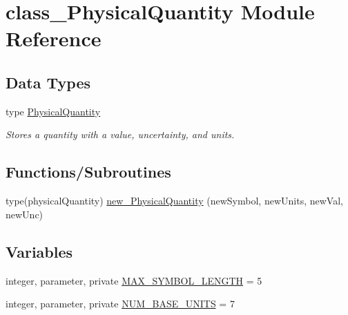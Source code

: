 \hypertarget{namespaceclass__PhysicalQuantity}{
\section{class\_\-PhysicalQuantity Module Reference}
\label{namespaceclass__PhysicalQuantity}
}
\subsection*{Data Types}
\begin{DoxyCompactItemize}
\item 
type \hyperlink{typeclass__PhysicalQuantity_1_1PhysicalQuantity}{PhysicalQuantity}
\begin{DoxyCompactList}\small\item\em Stores a quantity with a value, uncertainty, and units. \item\end{DoxyCompactList}\end{DoxyCompactItemize}
\subsection*{Functions/Subroutines}
\begin{DoxyCompactItemize}
\item 
type(physicalQuantity) \hyperlink{namespaceclass__PhysicalQuantity_ac1a3d1ca8ee8896007badfdcd7e3333b}{new\_\-PhysicalQuantity} (newSymbol, newUnits, newVal, newUnc)
\end{DoxyCompactItemize}
\subsection*{Variables}
\begin{DoxyCompactItemize}
\item 
integer, parameter, private \hyperlink{namespaceclass__PhysicalQuantity_a9a49f0ad012c6d03a17e68cc71867a2d}{MAX\_\-SYMBOL\_\-LENGTH} = 5
\item 
integer, parameter, private \hyperlink{namespaceclass__PhysicalQuantity_a2e10d9a38cddedc3b7705d597476550f}{NUM\_\-BASE\_\-UNITS} = 7
\end{DoxyCompactItemize}



